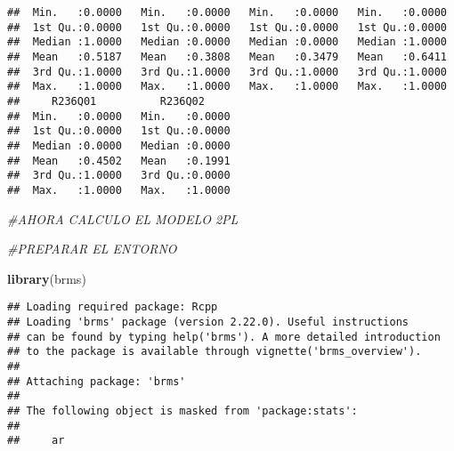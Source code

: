 \documentclass[
]{article}
\newenvironment{Shaded}{\begin{snugshade}}{\end{snugshade}}
\newcommand{\CommentTok}[1]{\textcolor[rgb]{0.56,0.35,0.01}{\textit{#1}}}
\newcommand{\FunctionTok}[1]{\textcolor[rgb]{0.13,0.29,0.53}{\textbf{#1}}}
\newcommand{\NormalTok}[1]{#1}
\begin{document}
\begin{verbatim}
##  Min.   :0.0000   Min.   :0.0000   Min.   :0.0000   Min.   :0.0000  
##  1st Qu.:0.0000   1st Qu.:0.0000   1st Qu.:0.0000   1st Qu.:0.0000  
##  Median :1.0000   Median :0.0000   Median :0.0000   Median :1.0000  
##  Mean   :0.5187   Mean   :0.3808   Mean   :0.3479   Mean   :0.6411  
##  3rd Qu.:1.0000   3rd Qu.:1.0000   3rd Qu.:1.0000   3rd Qu.:1.0000  
##  Max.   :1.0000   Max.   :1.0000   Max.   :1.0000   Max.   :1.0000  
##     R236Q01          R236Q02      
##  Min.   :0.0000   Min.   :0.0000  
##  1st Qu.:0.0000   1st Qu.:0.0000  
##  Median :0.0000   Median :0.0000  
##  Mean   :0.4502   Mean   :0.1991  
##  3rd Qu.:1.0000   3rd Qu.:0.0000  
##  Max.   :1.0000   Max.   :1.0000
\end{verbatim}

\begin{Shaded}
\begin{Highlighting}[]
\CommentTok{\#AHORA CALCULO EL MODELO 2PL}

\CommentTok{\#PREPARAR EL ENTORNO}

\FunctionTok{library}\NormalTok{(brms)}
\end{Highlighting}
\end{Shaded}

\begin{verbatim}
## Loading required package: Rcpp
## Loading 'brms' package (version 2.22.0). Useful instructions
## can be found by typing help('brms'). A more detailed introduction
## to the package is available through vignette('brms_overview').
## 
## Attaching package: 'brms'
## 
## The following object is masked from 'package:stats':
## 
##     ar
\end{verbatim}
\end{document}
